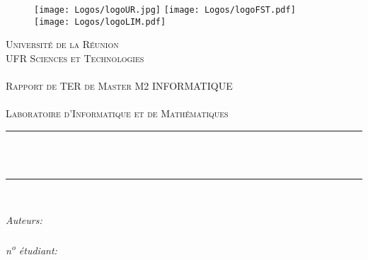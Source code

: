 \newcommand{\HRule}{\rule{\linewidth}{0.5mm}} %


\begin{titlepage}
	
	\begin{figure}[htbp!]
		\begin{center}
			\texttt{[image: Logos/logoUR.jpg]}\hspace{2cm}
			\texttt{[image: Logos/logoFST.pdf]}\hspace{2cm}  
			\texttt{[image: Logos/logoLIM.pdf]}%
		\end{center}
	\end{figure}

	\center %
	\textsc{\LARGE Université de la Réunion}\\[1.4cm]%
	\textsc{\Large UFR Sciences et Technologies}\\%
		\textsc{\Large ~}\\
	\textsc{\Large Rapport de TER de Master M2 INFORMATIQUE}\\%
	\textsc{\Large ~}\\
	\textsc{\Large Laboratoire d'Informatique et de Mathématiques}\\[1.4cm]%
	\HRule \\[0.4cm]
	{ \huge \bfseries \sffamily\mdseries\upshape \titre }\\[0.4cm] %
	\HRule \\[2cm]
	\begin{minipage}{0.4\textwidth}
		\begin{flushleft} \large
			\emph{Auteurs:}\\
			\auteuri \\    %
			\emph{n\textsuperscript{o} étudiant: \numetui}\\ %

\end{flushleft}
\end{minipage}
\end{titlepage}
